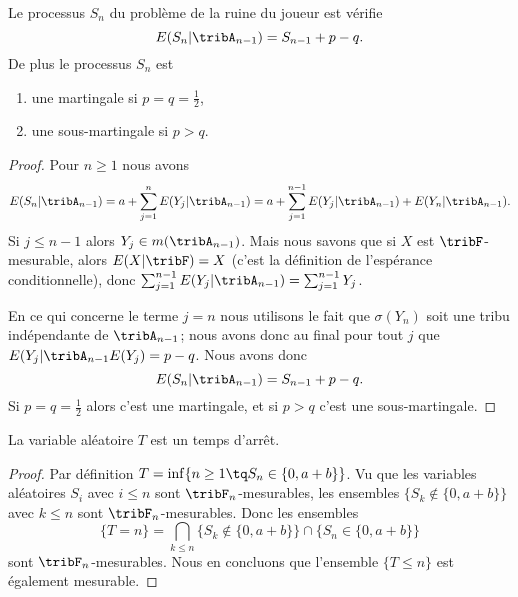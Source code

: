 \begin{lemma}   \label{LemEOAmVyZ}
    Le processus \( S_n\) du problème de la ruine du joueur est vérifie
    \begin{equation}    \label{EqZQtwVMXyiB}
        E(S_n|\tribA_{n-1})=S_{n-1}+p-q.
    \end{equation}
    De plus le processus \( S_n\) est
    \begin{enumerate}
        \item
            une martingale si \( p=q=\frac{ 1 }{2}\),
        \item
            une sous-martingale si \( p>q\).
    \end{enumerate}
\end{lemma}

\begin{proof}
    Pour \( n\geq 1 \) nous avons
    \begin{equation}
        E(S_n|\tribA_{n-1})=a+\sum_{j=1}^nE(Y_j|\tribA_{n-1})=a+\sum_{j=1}^{n-1}E(Y_j|\tribA_{n-1})+E(Y_n|\tribA_{n-1}).
    \end{equation}
    Si \( j\leq n-1\) alors \( Y_j\in m(\tribA_{n-1})\). Mais nous savons que si \( X\) est \( \tribF\)-mesurable, alors \( E(X|\tribF)=X\) (c'est la définition de l'espérance conditionnelle), donc \( \sum_{j=1}^{n-1}E(Y_j|\tribA_{n-1})=\sum_{j=1}^{n-1}Y_j\).

    En ce qui concerne le terme \( j=n\) nous utilisons le fait que \( \sigma(Y_n)\) soit une tribu indépendante de \( \tribA_{n-1}\); nous avons donc au final pour tout \( j\) que \( E(Y_j|\tribA_{n-1}E(Y_j)=p-q\). Nous avons donc
    \begin{equation}
        E(S_n|\tribA_{n-1})=S_{n-1}+p-q.
    \end{equation}
    Si \( p=q=\frac{ 1 }{2}\) alors c'est une martingale, et si \( p>q\) c'est une sous-martingale.
\end{proof}

\begin{lemma}   \label{LemXDlNxtE}
    La variable aléatoire \( T\) est un temps d'arrêt.
\end{lemma}

\begin{proof}
    Par définition \( T=\inf\{ n\geq 1\tq S_n\in\{ 0,a+b \} \}\). Vu que les variables aléatoires \( S_i\) avec \( i\leq n\) sont \( \tribF_n\)-mesurables, les ensembles \( \big\{ S_k\notin\{ 0,a+b \} \big\}\) avec \( k\leq n\) sont \( \tribF_n\)-mesurables. Donc les ensembles
    \begin{equation}
        \{ T=n \}=\bigcap_{k\leq n}\big\{ S_k\notin\{ 0,a+b \} \big\}\cap\big\{ S_n\in\{ 0,a+b \} \big\}
    \end{equation}
    sont \( \tribF_n\)-mesurables. Nous en concluons que l'ensemble \( \{ T\leq n \}\) est également mesurable.
\end{proof}

